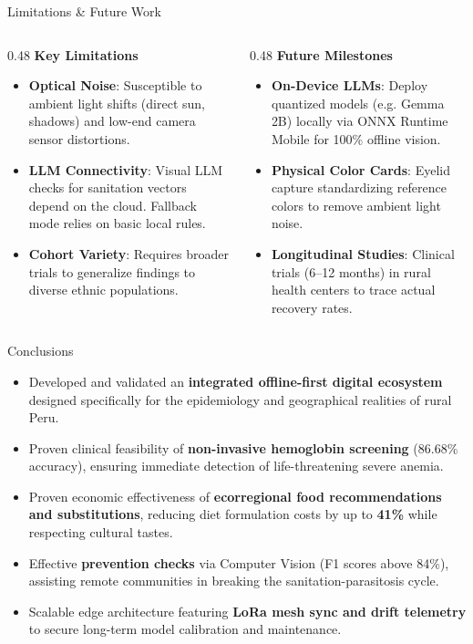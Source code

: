 \documentclass[aspectratio=169]{beamer}
\begin{document}
\begin{frame}{Limitations \& Future Work}
    \begin{columns}[T]
        \begin{column}{0.48\textwidth}
            \textbf{Key Limitations}
            \begin{itemize}
                \item \textbf{Optical Noise}: Susceptible to ambient light shifts (direct sun, shadows) and low-end camera sensor distortions.
                \item \textbf{LLM Connectivity}: Visual LLM checks for sanitation vectors depend on the cloud. Fallback mode relies on basic local rules.
                \item \textbf{Cohort Variety}: Requires broader trials to generalize findings to diverse ethnic populations.
            \end{itemize}
        \end{column}
        \begin{column}{0.48\textwidth}
            \textbf{Future Milestones}
            \begin{itemize}
                \item \textbf{On-Device LLMs}: Deploy quantized models (e.g. Gemma 2B) locally via ONNX Runtime Mobile for 100\% offline vision.
                \item \textbf{Physical Color Cards}: Eyelid capture standardizing reference colors to remove ambient light noise.
                \item \textbf{Longitudinal Studies}: Clinical trials (6--12 months) in rural health centers to trace actual recovery rates.
            \end{itemize}
        \end{column}
    \end{columns}
\end{frame}

\begin{frame}{Conclusions}
    \begin{itemize}
        \item Developed and validated an \textbf{integrated offline-first digital ecosystem} designed specifically for the epidemiology and geographical realities of rural Peru.
        \item Proven clinical feasibility of \textbf{non-invasive hemoglobin screening} (86.68\% accuracy), ensuring immediate detection of life-threatening severe anemia.
        \item Proven economic effectiveness of \textbf{ecorregional food recommendations and substitutions}, reducing diet formulation costs by up to \textbf{41\%} while respecting cultural tastes.
        \item Effective \textbf{prevention checks} via Computer Vision (F1 scores above 84\%), assisting remote communities in breaking the sanitation-parasitosis cycle.
        \item Scalable edge architecture featuring \textbf{LoRa mesh sync and drift telemetry} to secure long-term model calibration and maintenance.
    \end{itemize}
\end{frame}
\end{document}
